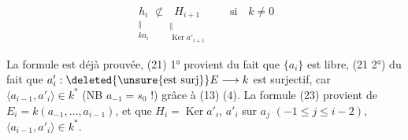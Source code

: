 \[\underset{\substack{\Vert\\ka_i}}{h_i}\not\subset\underset{\substack{\Vert\\\operatorname{Ker}a'_{i+1}}}{H_{i+1}}\qquad\text{si}\quad k\ne0\tag*{(25$'$)}\]

La formule  est déjà prouvée, (21) 1° provient du fait que $\{a_i\}$ est libre, (21 2°) du fait que $a'_i:\deleted{\unsure{\text{est surj}}} E\longrightarrow k$ est surjectif,  car $\langle a_{i-1},a'_i\rangle\in k^*$ (NB $a_{-1}=s_0$ !) grâce à (13) (4).  La formule (23) provient de $E_i=k(a_{-1},\ldots,a_{i-1})$, et que $H_i=\operatorname{Ker}a'_i$, $a'_i$  sur $a_j$ $(-1\leq j\leq i-2)$, $\langle a_{i-1},a'_i\rangle\in k^*$.

